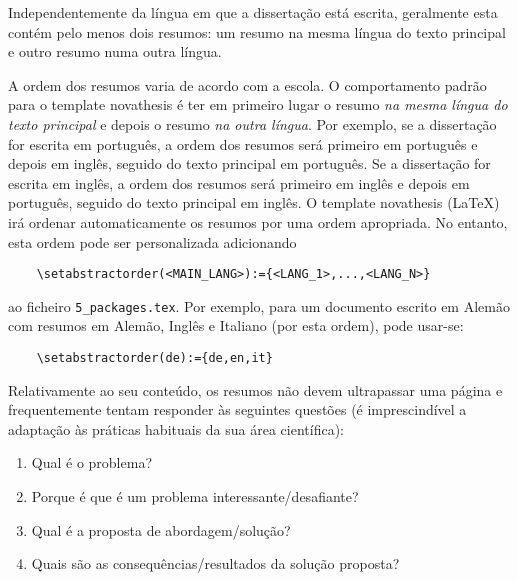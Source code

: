 
%

Independentemente da língua em que a dissertação está escrita, geralmente esta contém pelo menos dois resumos: um resumo na mesma língua do texto principal e outro resumo numa outra língua.

A ordem dos resumos varia de acordo com a escola. O comportamento padrão para o template \gls{novathesis} é ter em primeiro lugar o resumo \emph{na mesma língua do texto principal} e depois o resumo \emph{na outra língua}. Por exemplo, se a dissertação for escrita em português, a ordem dos resumos será primeiro em português e depois em inglês, seguido do texto principal em português. Se a dissertação for escrita em inglês, a ordem dos resumos será primeiro em inglês e depois em português, seguido do texto principal em inglês.
%
O template \gls{novathesis} (\LaTeX) irá ordenar automaticamente os resumos por uma ordem apropriada. No entanto, esta ordem pode ser personalizada adicionando
\begin{verbatim}
    \setabstractorder(<MAIN_LANG>):={<LANG_1>,...,<LANG_N>}
\end{verbatim}
\noindent ao ficheiro \verb!5_packages.tex!.  Por exemplo, para um documento escrito em Alemão com resumos em Alemão, Inglês e Italiano (por esta ordem), pode usar-se:
\begin{verbatim}
    \setabstractorder(de):={de,en,it}
\end{verbatim}

Relativamente ao seu conteúdo, os resumos não devem ultrapassar uma página e frequentemente tentam responder às seguintes questões (é imprescindível a adaptação às práticas habituais da sua área científica):

\begin{enumerate}
  \item Qual é o problema?
  \item Porque é que é um problema interessante/desafiante?
  \item Qual é a proposta de abordagem/solução?
  \item Quais são as consequências/resultados da solução proposta?
\end{enumerate}

%
%

